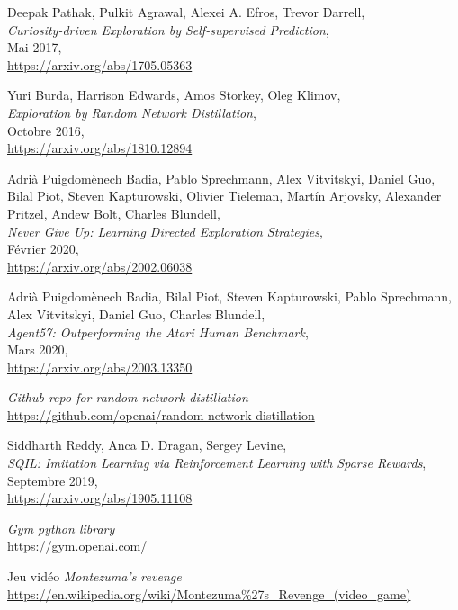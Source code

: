 \documentclass[a4paper,12pt]{report}
\begin{document}
\begin{thebibliography}{9}
	  Deepak Pathak, Pulkit Agrawal, Alexei A. Efros, Trevor Darrell,\\
	  \textit{Curiosity-driven Exploration by Self-supervised Prediction},\\
	  Mai 2017,\\
	  \url{https://arxiv.org/abs/1705.05363}
	  
	 Yuri Burda, Harrison Edwards, Amos Storkey, Oleg Klimov,\\
	  \textit{Exploration by Random Network Distillation},\\
	  Octobre 2016,\\
	  \url{https://arxiv.org/abs/1810.12894}
	  
	 Adrià Puigdomènech Badia, Pablo Sprechmann, Alex Vitvitskyi, Daniel Guo, Bilal Piot, Steven Kapturowski, Olivier Tieleman, Martín Arjovsky, Alexander Pritzel, Andew Bolt, Charles Blundell,\\
	  \textit{Never Give Up: Learning Directed Exploration Strategies},\\
	  Février 2020,\\
	  \url{https://arxiv.org/abs/2002.06038}
	  
	 Adrià Puigdomènech Badia, Bilal Piot, Steven Kapturowski, Pablo Sprechmann, Alex Vitvitskyi, Daniel Guo, Charles Blundell,\\
	  \textit{Agent57: Outperforming the Atari Human Benchmark},\\
	  Mars 2020,\\
	  \url{https://arxiv.org/abs/2003.13350}
	  
	  \textit{Github repo for random network distillation}\\
	  \url{https://github.com/openai/random-network-distillation}
	  
	  Siddharth Reddy, Anca D. Dragan, Sergey Levine,\\
	  \textit{SQIL: Imitation Learning via Reinforcement Learning with Sparse Rewards},\\
	  Septembre 2019,\\
	  \url{https://arxiv.org/abs/1905.11108}
	  
	\textit{Gym python library}\\
	\url{https://gym.openai.com/}
	
	Jeu vidéo \textit{Montezuma's revenge}\\
	\url{https://en.wikipedia.org/wiki/Montezuma%27s_Revenge_(video_game)}
\end{thebibliography}
\end{document}

